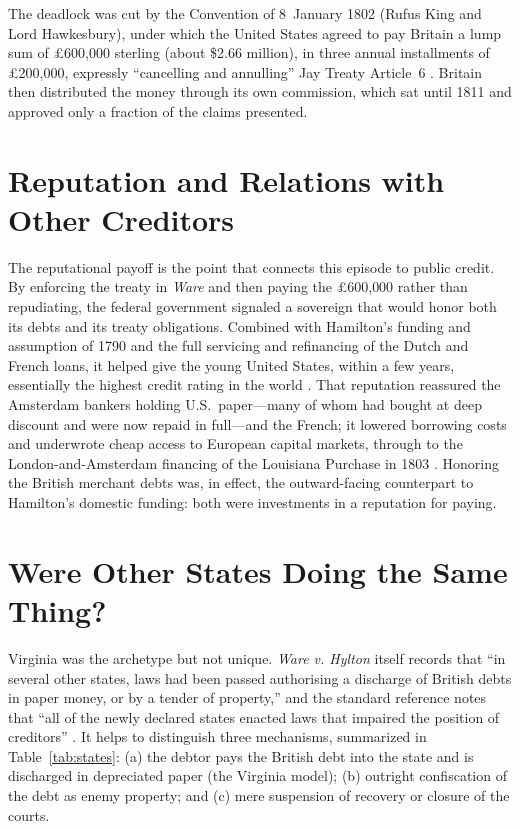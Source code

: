 \documentclass[12pt]{article}
\begin{document}
The deadlock was cut by the Convention of 8~January 1802 (Rufus King and Lord
Hawkesbury), under which the United States agreed to pay Britain a lump sum of
\pounds600{,}000 sterling (about \$2.66 million), in three annual installments of
\pounds200{,}000, expressly ``cancelling and annulling'' Jay Treaty Article~6
\citep{convention1802}. Britain then distributed the money through its own
commission, which sat until 1811 and approved only a fraction of the claims
presented.

\section{Reputation and Relations with Other Creditors}
\label{sec:reputation}

The reputational payoff is the point that connects this episode to public credit.
By enforcing the treaty in \emph{Ware} and then paying the \pounds600{,}000 rather
than repudiating, the federal government signaled a sovereign that would honor both
its debts and its treaty obligations. Combined with Hamilton's funding and
assumption of 1790 and the full servicing and refinancing of the Dutch and French
loans, it helped give the young United States, within a few years, essentially the
highest credit rating in the world \citep{sylla2011financial, edling2014hercules}.
That reputation reassured the Amsterdam bankers holding U.S.\ paper---many of whom
had bought at deep discount and were now repaid in full---and the French; it
lowered borrowing costs and underwrote cheap access to European capital markets,
through to the London-and-Amsterdam financing of the Louisiana Purchase in 1803
\citep{statedept_loans, sylla2011financial}. Honoring the British merchant debts
was, in effect, the outward-facing counterpart to Hamilton's domestic funding:
both were investments in a reputation for paying.

\section{Were Other States Doing the Same Thing?}
\label{sec:other-states}

Virginia was the archetype but not unique. \emph{Ware v. Hylton} itself records
that ``in several other states, laws had been passed authorising a discharge of
British debts in paper money, or by a tender of property,'' and the standard
reference notes that ``all of the newly declared states enacted laws that impaired
the position of creditors'' \citep{warevhylton1796, adamson2003british}. It helps
to distinguish three mechanisms, summarized in Table~\ref{tab:states}: (a) the
debtor pays the British debt into the state and is discharged in depreciated paper
(the Virginia model); (b) outright confiscation of the debt as enemy property; and
(c) mere suspension of recovery or closure of the courts.
\end{document}
